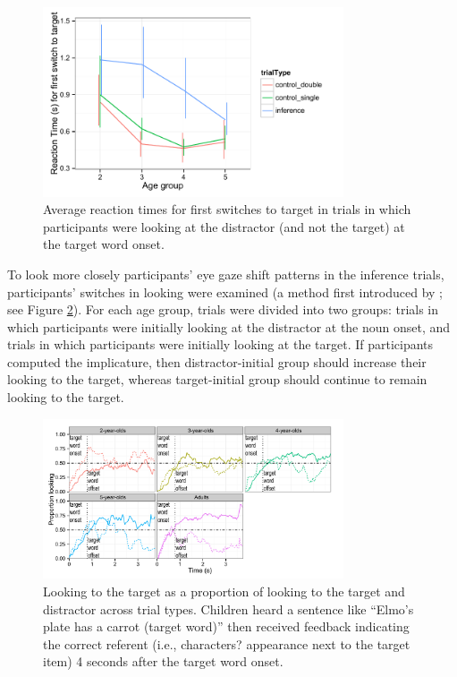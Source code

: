 \documentclass[10pt,letterpaper]{article}
\begin{document}
\begin{figure}
\begin{center} 
\includegraphics[width=3.5in]{figures/150116-0-rt_age.pdf}
\caption{\label{fig:rt} Average reaction times for first switches to target in trials in which participants were looking at the distractor (and not the target) at the target word onset.}
\end{center} 
\end{figure}

To look more closely participants' eye gaze shift patterns in the inference trials, participants' switches in looking were examined (a method first introduced by ; see Figure \ref{fig:onset}).  For each age group, trials were divided into two groups: trials in which participants were initially looking at the distractor at the noun onset, and trials in which participants were initially looking at the target.  If participants computed the implicature, then distractor-initial group should increase their looking to the target, whereas target-initial group should continue to remain looking to the target. 

\begin{figure}
\begin{center} 
\includegraphics[width=3.5in]{figures/140521-simpimp_age_targAtOnset-edit.pdf}
\caption{\label{fig:onset} Looking to the target as a proportion of looking to the target and distractor across trial types. Children heard a sentence like ``Elmo's plate has a carrot (target word)'' then received feedback indicating the correct referent (i.e., characters? appearance next to the target item) 4 seconds after the target word onset.}
\end{center} 
\end{figure}
\end{document}
